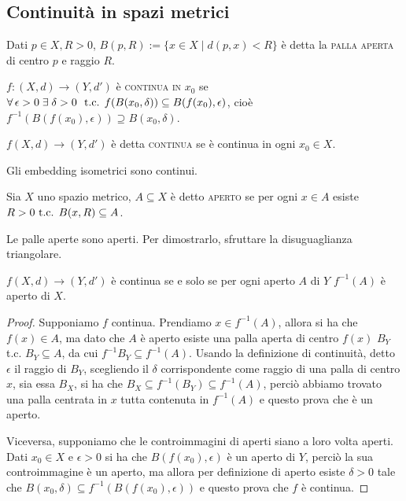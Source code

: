 \documentclass{article}
\begin{document}
\subsection{Continuità in spazi metrici}
\begin{defn}
Dati $p \in X, R>0$, ${B(p, R):=\{ x \in X \mid d(p, x)<R\}}$ è detta la
\textsc{palla aperta} di centro $p$ e raggio $R$.
\end{defn}

\begin{defn}
${f:(X, d) \rightarrow (Y, d')}$ è \textsc{continua in $x_0$} se
${\forall \epsilon > 0 \; \exists \; \delta >0}\\\ \tc {f(B(x_0, \delta))
\subseteq B(f(x_0), \epsilon)}$, cioè ${f^{-1}(B(f(x_0), \epsilon)) \supseteq
B(x_0, \delta)}$.
\end{defn}

\begin{defn}
${f(X, d) \rightarrow (Y, d')}$ è detta \textsc{continua} se è continua in ogni
${x_0 \in X}$.
\end{defn}

\begin{oss}
Gli embedding isometrici sono continui.
\end{oss}

\begin{defn}
Sia $X$ uno spazio metrico, $A \subseteq X$ è detto \textsc{aperto} se per ogni
$x \in A$ esiste ${R>0 \text{ t.c. } B(x, R) \subseteq A}$.
\end{defn}

\begin{ftt}
Le palle aperte sono aperti. Per dimostrarlo, sfruttare la disuguaglianza
triangolare.
\end{ftt}

\begin{thm}
$f(X, d) \rightarrow (Y, d')$ è continua se e solo se per ogni aperto $A$ di $Y$
$f^{-1}(A)$ è aperto di $X$.
\end{thm}

\begin{proof}
Supponiamo $f$ continua. Prendiamo $x \in f^{-1}(A)$, allora si ha che $f(x) \in
A$, ma dato che $A$ è aperto esiste una palla aperta di centro $f(x)$ $B_Y$ t.c.
$B_Y \subseteq A$, da cui $f^{-1}{B_Y} \subseteq f^{-1}(A)$. Usando la
definizione di continuità, detto $\epsilon$ il raggio di $B_Y$, scegliendo il
$\delta$ corrispondente come raggio di una palla di centro $x$, sia essa $B_X$,
si ha che $B_X \subseteq f^{-1}(B_Y) \subseteq f^{-1}(A)$, perciò abbiamo
trovato una palla centrata in $x$ tutta contenuta in $f^{-1}(A)$ e questo prova
che è un aperto.

Viceversa, supponiamo che le controimmagini di aperti siano a loro volta aperti.
Dati $x_0 \in X$ e $\epsilon >0$ si ha che $B(f(x_0), \epsilon)$ è un aperto di
$Y$, perciò la sua controimmagine è un aperto, ma allora per definizione di
aperto esiste $\delta>0$ tale che $B(x_0, \delta) \subseteq f^{-1}(B(f(x_0),
\epsilon))$ e questo prova che $f$ è continua.
\end{proof}
\end{document}
